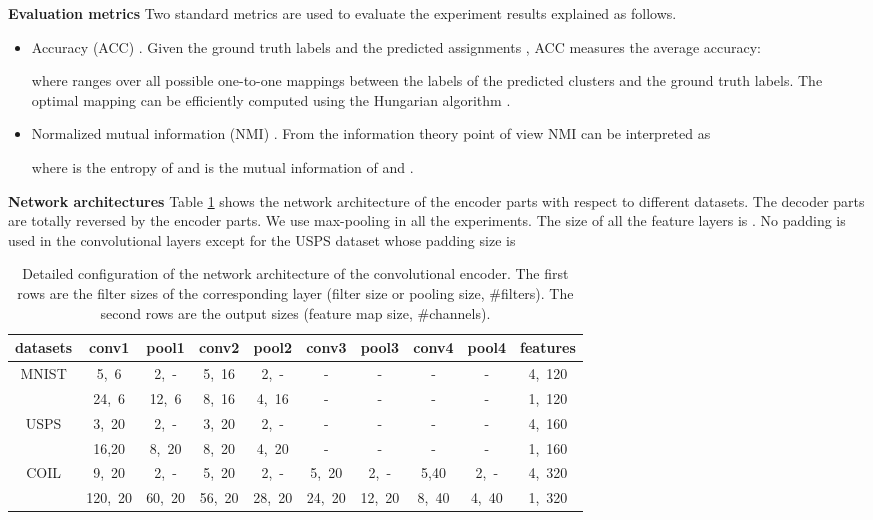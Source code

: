 \documentclass[preprint,12pt]{elsarticle}
\begin{document}
\textbf{Evaluation metrics} Two standard metrics are used to evaluate the experiment results explained as follows.
\begin{itemize}
\item Accuracy (ACC) \cite{Xie2015DEC}. Given the ground truth labels  and the predicted
assignments , ACC measures the average accuracy:

where  ranges over all possible one-to-one mappings between the labels of the predicted clusters and
the ground truth labels. The optimal mapping can be efficiently computed using
the Hungarian algorithm \cite{Kuhn1995Hungarian}.
\item Normalized mutual information (NMI) \cite{Cai2011NMI}. From the information theory point of view
NMI can be interpreted as

where  is the entropy of  and  is the mutual information of  and .
\end{itemize}


\textbf{Network architectures}
Table \ref{tab:net-architecture} shows the network architecture of the encoder parts with respect to different datasets.
The decoder parts are totally reversed by the encoder parts. We use max-pooling in all the experiments.
The size of all the feature layers is . No padding is used in the convolutional layers except
for the USPS dataset whose padding size is 

\begin{table}[!htb]
\caption{Detailed configuration of the network architecture of the convolutional encoder.
The first rows are the filter sizes of the corresponding layer (filter size or pooling size, \#filters).
The second rows are the output sizes (feature map size, \#channels).
}\label{tab:net-architecture}
\begin{center}
\begin{scriptsize}
\begin{tabular}{cccccccccc}
\toprule
datasets & conv1 & pool1 & conv2 & pool2 & conv3 & pool3 & conv4 & pool4 & features \\ \midrule
\multirow{2}{*}{MNIST}  & 5,~6 & 2,~-  & 5,~16  & 2,~- & - & - & - & - & 4,~120 \\
 & 24,~6 & 12,~6 & 8,~16 & 4,~16 & - & - & - & - & 1,~120 \\ \midrule
\multirow{2}{*}{USPS} & 3,~20 & 2,~- & 3,~20  & 2,~- & - & - & - & - & 4,~160 \\
 & 16,20 & 8,~20 & 8,~20 & 4,~20 & - & - & - & - & 1,~160 \\ \midrule
\multirow{2}{*}{COIL}  & 9,~20 & 2,~- & 5,~20  & 2,~- & 5,~20 & 2,~- & 5,40 & 2,~- & 4,~320 \\
 & 120,~20 & 60,~20 & 56,~20 & 28,~20 & 24,~20 & 12,~20 & 8,~40 & 4,~40 & 1,~320\\
\bottomrule
\end{tabular}
\end{scriptsize}
\end{center}
\end{table}
\end{document}
